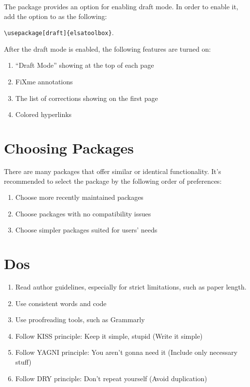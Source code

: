 The \elsatoolbox{} package provides an option for enabling draft mode. In order to enable it, add the option  to \elsatoolbox{} as the following:

\begin{center}
    \verb|\usepackage[draft]{elsatoolbox}|.
\end{center}

After the draft mode is enabled, the following features are turned on:

\begin{enumerate}
    \item ``Draft Mode'' showing at the top of each page
    \item FiXme annotations
    \item The list of corrections showing on the first page
    \item Colored hyperlinks
\end{enumerate}

\section*{Choosing Packages}

There are many packages that offer similar or identical functionality. It's recommended to select the package by the following order of preferences:

\begin{enumerate}
    \item Choose more recently maintained packages
    \item Choose packages with no compatibility issues
    \item Choose simpler packages suited for users' needs
\end{enumerate}

\section*{Dos}

\begin{enumerate}
    \item Read author guidelines, especially for strict limitations, such as paper length.
    \item Use consistent words and code
    \item Use proofreading tools, such as Grammarly
    \item Follow KISS principle: Keep it simple, stupid (Write it simple)
    \item Follow YAGNI principle: You aren't gonna need it (Include only necessary stuff)
    \item Follow DRY principle: Don't repeat yourself (Avoid duplication)
\end{enumerate}

